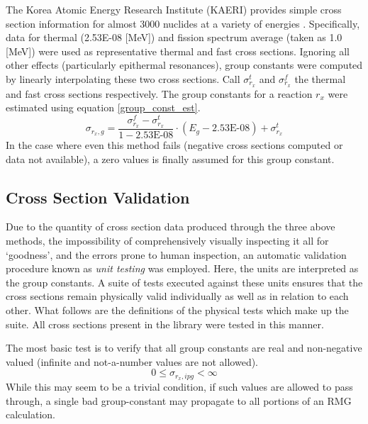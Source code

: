 The Korea Atomic Energy Research Institute (KAERI) provides simple cross section information
for almost 3000 nuclides at a variety of energies \cite{KAER2000}.  Specifically, data for
thermal (2.53E-08 [MeV]) and fission spectrum average (taken as 1.0 [MeV]) were used as representative
thermal and fast cross sections.  Ignoring all other effects (particularly epithermal resonances), 
group constants were computed by linearly interpolating these two cross sections.  Call 
$\sigma_{r_x}^t$ and $\sigma_{r_x}^f$ the thermal and fast cross sections respectively.  The group
constants for a reaction $r_x$ were estimated using equation \ref{group_const_est}.
\begin{equation}
\label{group_const_est}
\sigma_{r_x,g} = \frac{\sigma_{r_x}^f - \sigma_{r_x}^t}{1 - \mbox{2.53E-08}} \cdot (E_g - \mbox{2.53E-08}) + \sigma_{r_x}^t
\end{equation}
In the case where even this method fails (negative cross sections computed or data not available), 
a zero values is finally assumed for this group constant.

\subsection{Cross Section Validation}
\label{mg:xs_validation}
Due to the quantity of cross section data produced through the three above methods, the 
impossibility of comprehensively visually inspecting it all for `goodness', and the errors 
prone to human inspection, an automatic validation procedure known as \emph{unit testing}
was employed.  Here, the units are interpreted as the group constants.   A suite of tests 
executed against these units ensures that the cross sections remain physically valid 
individually as well as in relation to each other. What follows are the definitions of the 
physical tests which make up the suite.  All cross sections present in the library were tested 
in this manner.

The most basic test is to verify that all group constants are real and non-negative valued 
(infinite and not-a-number values are not allowed).  
\begin{equation}
\label{nn_ut}
0 \le \sigma_{r_x,ipg} < \infty
\end{equation}
While this may seem to be a trivial 
condition, if such values are allowed to pass through, a single bad group-constant may 
propagate to all portions of an RMG calculation.

